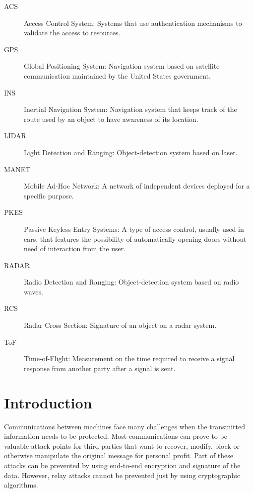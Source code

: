 \documentclass{article}
\begin{document}
\begin{description}
  \item[ACS] Access Control System: Systems that use authentication mechanisms to validate the access to resources.
  \item[GPS] Global Positioning System: Navigation system based on satellite communication maintained by the United States government.
  \item[INS] Inertial Navigation System: Navigation system that keeps track of the route used by an object to have awareness of its location.
  \item[LIDAR] Light Detection and Ranging: Object-detection system based on laser.
  \item[MANET] Mobile Ad-Hoc Network: A network of independent devices deployed for a specific purpose.
  \item[PKES] Passive Keyless Entry Systems: A type of access control, usually used in cars, that features the possibility of automatically opening doors without need of interaction from the user.
  \item[RADAR] Radio Detection and Ranging: Object-detection system based on radio waves.
  \item[RCS] Radar Cross Section: Signature of an object on a radar system.
  \item[ToF] Time-of-Flight: Measurement on the time required to receive a signal response from another party after a signal is sent.
\end{description}

\newpage



\tableofcontents





\newpage








\section{Introduction}
\label{sec:introduction}

Communications between machines face many challenges when the transmitted information needs to be protected. Most communications can prove to be valuable attack points for third parties that want to recover, modify, block or otherwise manipulate the original message for personal profit. Part of these attacks can be prevented by using end-to-end encryption and signature of the data. However, relay attacks cannot be prevented just by using cryptographic algorithms.
\end{document}
